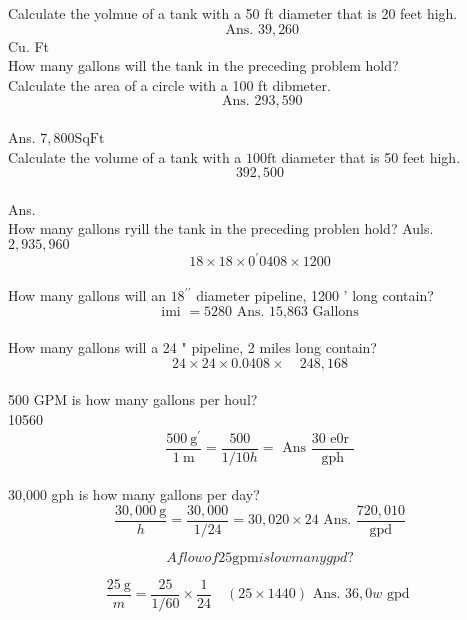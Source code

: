 Calculate the yolmue of a tank with a 50 ft diameter that is 20 feet high.\\
$$\text { Ans. } 39,260$$Cu. Ft\\

How many gallons will the tank in the preceding problem hold?\\

Calculate the area of a circle with a 100 ft dibmeter.\\
$$\text { Ans. } 293,590$$\\
Ans. $7,800 \mathrm{Sq} \mathrm{Ft}$\\

Calculate the volume of a tank with a $100 \mathrm{ft}$ diameter that is 50 feet high.\\
$$392,500$$\\
Ans.\\

How many gallons ryill the tank in the preceding problen hold? Auls.\\
$2,935,960$\\
$$18 \times 18 \times 0^{\prime} 0408 \times 1200$$\\

How many gallons will an $18^{\prime \prime}$ diameter pipeline, 1200 ' long contain?\\
$$\text { imi }=5280 \text { Ans. 15,863 Gallons }$$\\

How many gallons will a 24 " pipeline, 2 miles long contain?\\
$$24 \times 24 \times 0.0408 \times \quad 248,168$$\\

500 GPM is how many gallons per houl?\\
10560\\
$$\frac{500 \mathrm{~g}^{\prime}}{1 \mathrm{~m}}=\frac{500}{1 / 10 h}=\text { Ans } \frac{30 \text { e0r }}{\mathrm{gph}}$$\\

30,000 gph is how many gallons per day?\\
$$\frac{30,000 \mathrm{~g}}{h}=\frac{30,000}{1 / 24}=30,020 \times 24 \text { Ans. } \frac{720,010}{\mathrm{gpd}}$$

$$A flow of 25 \mathrm{gpm} is low many gpd?$$

$$\frac{25 \mathrm{~g}}{m}=\frac{25}{1 / 60} \times \frac{1}{24} \quad(25 \times 1440) \text { Ans. } 36,0 w \text { gpd }$$\\


